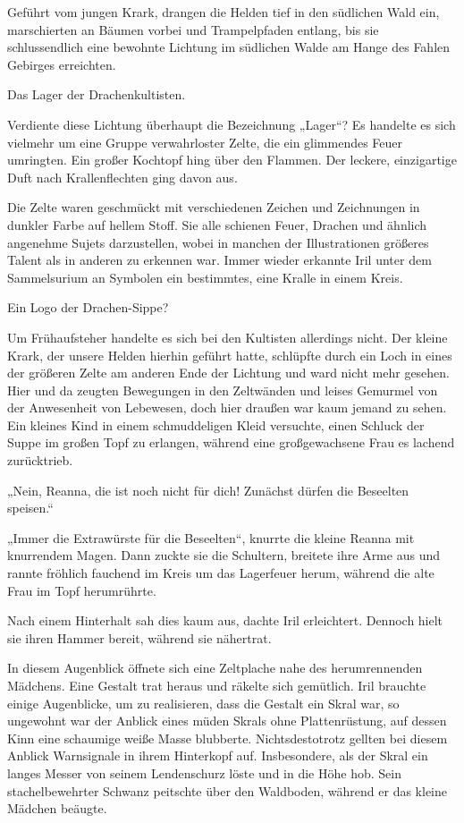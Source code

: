 Geführt vom jungen Krark, drangen die Helden tief in den südlichen Wald ein, marschierten an Bäumen vorbei und Trampelpfaden entlang, bis sie schlussendlich eine bewohnte Lichtung im südlichen Walde am Hange des Fahlen Gebirges erreichten.

Das Lager der Drachenkultisten.



\trennzeichen



Verdiente diese Lichtung überhaupt die Bezeichnung „Lager“? Es handelte es sich vielmehr um eine Gruppe verwahrloster Zelte, die ein glimmendes Feuer umringten. Ein großer Kochtopf hing über den Flammen. Der leckere, einzigartige Duft nach Krallenflechten ging davon aus.

Die Zelte waren geschmückt mit verschiedenen Zeichen und Zeichnungen in dunkler Farbe auf hellem Stoff. Sie alle schienen Feuer, Drachen und ähnlich angenehme Sujets darzustellen, wobei in manchen der Illustrationen größeres Talent als in anderen zu erkennen war. Immer wieder erkannte Iril unter dem Sammelsurium an Symbolen ein bestimmtes, eine Kralle in einem Kreis.

Ein Logo der Drachen-Sippe?

Um Frühaufsteher handelte es sich bei den Kultisten allerdings nicht. Der kleine Krark, der unsere Helden hierhin geführt hatte, schlüpfte durch ein Loch in eines der größeren Zelte am anderen Ende der Lichtung und ward nicht mehr gesehen. Hier und da zeugten Bewegungen in den Zeltwänden und leises Gemurmel von der Anwesenheit von Lebewesen, doch hier draußen war kaum jemand zu sehen. Ein kleines Kind in einem schmuddeligen Kleid versuchte, einen Schluck der Suppe im großen Topf zu erlangen, während eine großgewachsene Frau es lachend zurücktrieb.

„Nein, Reanna, die ist noch nicht für dich! Zunächst dürfen die Beseelten speisen.“

„Immer die Extrawürste für die Beseelten“, knurrte die kleine Reanna mit knurrendem Magen. Dann zuckte sie die Schultern, breitete ihre Arme aus und rannte fröhlich fauchend im Kreis um das Lagerfeuer herum, während die alte Frau im Topf herumrührte.

Nach einem Hinterhalt sah dies kaum aus, dachte Iril erleichtert. Dennoch hielt sie ihren Hammer bereit, während sie nähertrat.

In diesem Augenblick öffnete sich eine Zeltplache nahe des herumrennenden Mädchens. Eine Gestalt trat heraus und räkelte sich gemütlich. Iril brauchte einige Augenblicke, um zu realisieren, dass die Gestalt ein Skral war, so ungewohnt war der Anblick eines müden Skrals ohne Plattenrüstung, auf dessen Kinn eine schaumige weiße Masse blubberte. Nichtsdestotrotz gellten bei diesem Anblick Warnsignale in ihrem Hinterkopf auf. Insbesondere, als der Skral ein langes Messer von seinem Lendenschurz löste und in die Höhe hob. Sein stachelbewehrter Schwanz peitschte über den Waldboden, während er das kleine Mädchen beäugte.

